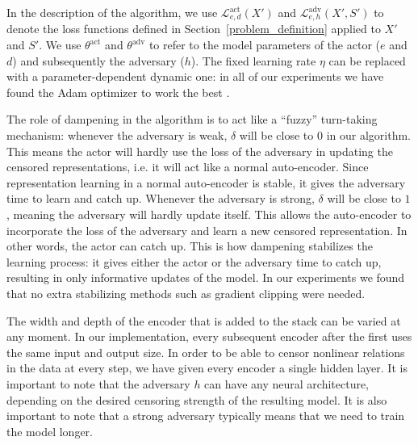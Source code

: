 \documentclass[nohyperref]{article}
\theoremstyle{plain}
\theoremstyle{definition}
\theoremstyle{remark}
\begin{document}
In the description of the algorithm, we use $\mathcal{L}^{\mathop{act}}_{e,d}(X')$ and $\mathcal{L}^{\mathop{adv}}_{e,h}(X',S')$ to denote the loss functions defined in Section~\ref{problem_definition} applied to $X'$ and $S'$. We use $\theta^{\mathop{act}}$ and $\theta^{\mathop{adv}}$ to refer to the model parameters of the actor ($e$ and $d$) and subsequently the adversary ($h$). The fixed learning rate $\eta$ can be replaced with a parameter-dependent dynamic one: in all of our experiments we have found the Adam optimizer to work the best \cite{journals/corr/KingmaB14}. 

The role of dampening in the algorithm is to act like a ``fuzzy'' turn-taking mechanism: whenever the adversary is weak, $\delta$ will be close to $0$ in our algorithm. This means the actor will hardly use the loss of the adversary in updating the censored representations, i.e. it will act like a normal auto-encoder. Since representation learning in a normal auto-encoder is stable, it gives the adversary time to learn and catch up. Whenever the adversary is strong, $\delta$ will be close to $1$, meaning the adversary will hardly update itself. This allows the auto-encoder to incorporate the loss of the adversary and learn a new censored representation. In other words, the actor can catch up. This is how dampening stabilizes the learning process: it gives either the actor or the adversary time to catch up, resulting in only informative updates of the model. In our experiments we found that no extra stabilizing methods such as gradient clipping were needed.

The width and depth of the encoder that is added to the stack can be varied at any moment. In our implementation, every subsequent encoder after the first uses the same input and output size. In order to be able to censor nonlinear relations in the data at every step, we have given every encoder a single hidden layer. It is important to note that the adversary $h$ can have any neural architecture, depending on the desired censoring strength of the resulting model. It is also important to note that a strong adversary typically means that we need to train the model longer.
\end{document}
